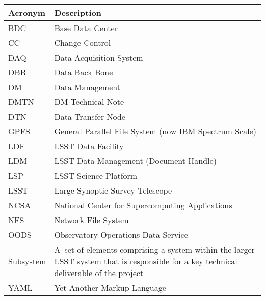 \addtocounter{table}{-1}
\begin{longtable}{p{}p{}}\hline
\textbf{Acronym} & \textbf{Description}  \\\hline

BDC &  Base Data Center \\\hline
CC & Change Control \\\hline
DAQ & Data Acquisition System \\\hline
DBB & Data Back Bone \\\hline
DM & Data Management \\\hline
DMTN & DM Technical Note \\\hline
DTN & Data Transfer Node \\\hline
GPFS & General Parallel File System (now IBM Spectrum Scale) \\\hline
LDF & LSST Data Facility \\\hline
LDM & LSST Data Management (Document Handle) \\\hline
LSP & LSST Science Platform \\\hline
LSST & Large Synoptic Survey Telescope \\\hline
NCSA & National Center for Supercomputing Applications \\\hline
NFS & Network File System \\\hline
OODS & Observatory Operations Data Service \\\hline
Subsystem & A set of elements comprising a system within the larger LSST system that is responsible for a key technical deliverable of the project \\\hline
YAML & Yet Another Markup Language \\\hline
\end{longtable}
